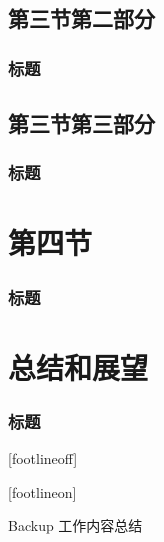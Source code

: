 \documentclass[xetex,mathserif,serif,handout]{beamer}
\begin{document}
	\subsection{第三节第二部分}
	\begin{frame}
		\frametitle{标题}
	\end{frame}
	\subsection{第三节第三部分}
	\begin{frame}
		\frametitle{标题}
	\end{frame}

	\section{第四节}
	\begin{frame}
		\frametitle{标题}
	\end{frame}

	\section{总结和展望}
	\begin{frame}
		\frametitle{标题}
	\end{frame}

	[footlineoff]%
	\begin{frame}[noframenumbering]
		\thanks
	\end{frame}
	[footlineon]%

	\begin{frame}[noframenumbering]{Backup}
		工作内容总结
	\end{frame}
\end{document}
